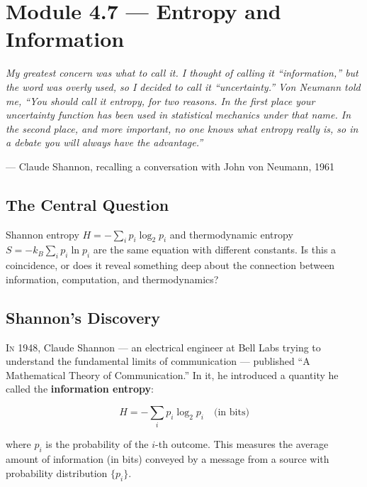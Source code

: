 \documentclass[12pt, a4paper, twoside]{book}
\begin{document}
\section{Module 4.7 — Entropy and Information}
\label{sec:information}

\epigraph{\itshape
  My greatest concern was what to call it. I thought of calling it
  ``information,'' but the word was overly used, so I decided to
  call it ``uncertainty.'' Von Neumann told me, ``You should call it
  entropy, for two reasons. In the first place your uncertainty
  function has been used in statistical mechanics under that name.
  In the second place, and more important, no one knows what entropy
  really is, so in a debate you will always have the advantage.''
}{--- Claude Shannon, recalling a conversation with John von Neumann, 1961}

\subsection{The Central Question}

\begin{puzzlebox}
Shannon entropy $H = -\sum_i p_i \log_2 p_i$ and thermodynamic entropy $S = -k_B\sum_i p_i \ln p_i$ are the same equation with different constants. Is this a coincidence, or does it reveal something deep about the connection between information, computation, and thermodynamics?
\end{puzzlebox}

\subsection{Shannon's Discovery}

\lettrine[lines=3,loversize=0.08]{\textcolor{accent}{I}}{n} 1948, Claude Shannon --- an electrical engineer at Bell Labs trying to understand the fundamental limits of communication --- published ``A Mathematical Theory of Communication.'' In it, he introduced a quantity he called the \textbf{information entropy}:

\begin{equation}
  H = -\sum_i p_i \log_2 p_i \quad\text{(in bits)}
\end{equation}

where $p_i$ is the probability of the $i$-th outcome. This measures the average amount of information (in bits) conveyed by a message from a source with probability distribution $\{p_i\}$.
\end{document}
